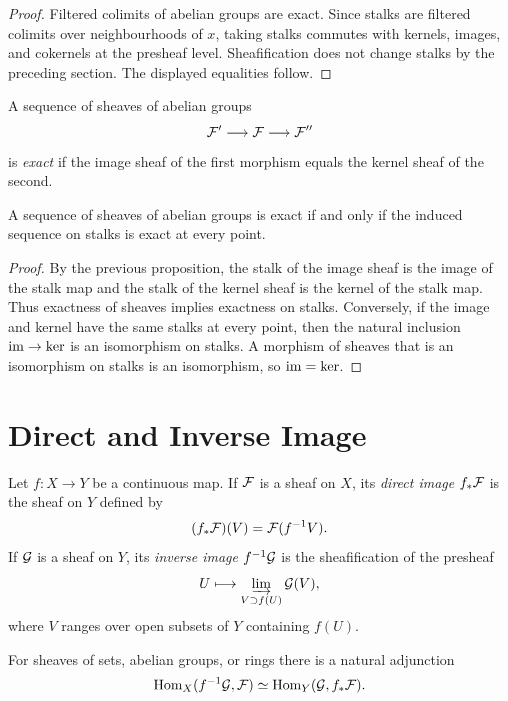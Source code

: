 \begin{proof}
Filtered colimits of abelian groups are exact.  Since stalks are filtered
colimits over neighbourhoods of \(x\), taking stalks commutes with kernels,
images, and cokernels at the presheaf level.  Sheafification does not change
stalks by the preceding section.  The displayed equalities follow.
\end{proof}

\begin{definition}
A sequence of sheaves of abelian groups
\[
    \mathcal{F}'\longrightarrow \mathcal{F}\longrightarrow \mathcal{F}''
\]
is \emph{exact} if the image sheaf of the first morphism equals the kernel
sheaf of the second.
\end{definition}

\begin{proposition}
A sequence of sheaves of abelian groups is exact if and only if the induced
sequence on stalks is exact at every point.
\end{proposition}

\begin{proof}
By the previous proposition, the stalk of the image sheaf is the image of the
stalk map and the stalk of the kernel sheaf is the kernel of the stalk map.
Thus exactness of sheaves implies exactness on stalks.  Conversely, if the
image and kernel have the same stalks at every point, then the natural inclusion
\(\operatorname{im}\to\ker\) is an isomorphism on stalks.  A morphism of sheaves that is an
isomorphism on stalks is an isomorphism, so \(\operatorname{im}=\ker\).
\end{proof}

\section{Direct and Inverse Image}

\begin{definition}
Let \(f:X\to Y\) be a continuous map.  If \(\mathcal{F}\) is a sheaf on \(X\), its
\emph{direct image} \(f_*\mathcal{F}\) is the sheaf on \(Y\) defined by
\[
    (f_*\mathcal{F})(V)=\mathcal{F}(f^{-1}V).
\]
If \(\mathcal{G}\) is a sheaf on \(Y\), its \emph{inverse image} \(f^{-1}\mathcal{G}\) is the
sheafification of the presheaf
\[
    U\longmapsto \varinjlim_{V\supset f(U)}\mathcal{G}(V),
\]
where \(V\) ranges over open subsets of \(Y\) containing \(f(U)\).
\end{definition}

\begin{proposition}
For sheaves of sets, abelian groups, or rings there is a natural adjunction
\[
    \operatorname{Hom}_X(f^{-1}\mathcal{G},\mathcal{F})\simeq \operatorname{Hom}_Y(\mathcal{G},f_*\mathcal{F}).
\]
\end{proposition}

